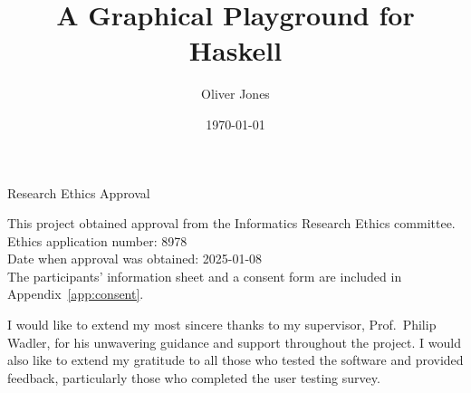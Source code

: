 \documentclass[../main.tex]{subfiles}
\begin{document}
\begin{preliminary}

    \title{A Graphical Playground for Haskell}
    \author{Oliver Jones}
    \date{\today}

    \abstract{
    }

    \maketitle

    \newenvironment{ethics}{
        \begin{frontenv}{Research Ethics Approval}{\LARGE}} {
        \end{frontenv}
        \newpage}

    \begin{ethics}
        \raggedright
        This project obtained approval from the Informatics Research Ethics committee.
        \\
        Ethics application number: 8978
        \\
        Date when approval was obtained: 2025-01-08
        \\

        The participants' information sheet and a consent form are included in
            Appendix~\ref{app:consent}.
        \\

        \standarddeclaration
    \end{ethics}

    \begin{acknowledgements}
        I would like to extend my most sincere thanks to my supervisor, Prof.~Philip
            Wadler, for his unwavering guidance and support throughout the project.
        I would also like to extend my gratitude to all those who tested the software
            and provided feedback, particularly those who completed the user testing
            survey.
    \end{acknowledgements}

    \tableofcontents
\end{preliminary}
\end{document}
